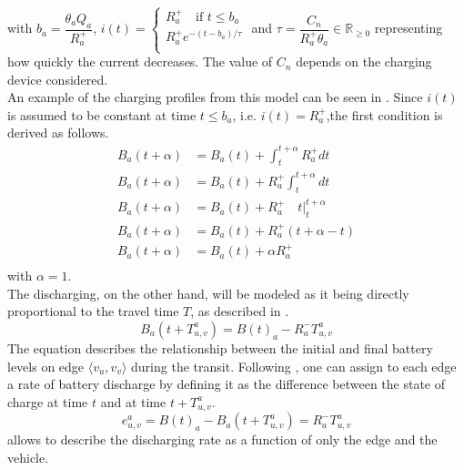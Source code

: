 with $b_a = \dfrac{\theta_a Q_a}{R^+_a}$,  $i(t)= \begin{cases} R^+_a \quad \text{if } t \leq  b_a\\
	R^+_a e^{-(t-b_a)/\tau}\\ \end{cases}$ and $\tau= \dfrac{C_n}{R^+_a\theta_a}\in \mathbb{R}_{\ge0}$  representing how quickly the current decreases. The value of $C_n$ depends on the charging device considered.   \\
	An example of the charging profiles from this model can be seen in . 
	 Since $i(t)$ is assumed to be constant at time $t\leq b_a$, i.e. $i(t) = R^+_a$,the first condition is derived as follows. 
\begin{align*}
	B_a(t+\alpha) &= B_a(t) + \int_{t}^{t+\alpha}R^+_adt\\
	B_a(t+\alpha) &= B_a(t) +R^+_a \int_{t}^{t+\alpha}dt\\
	B_a(t+\alpha) &= B_a(t) +R^+_a \quad t \bigg|_{t}^{t+\alpha}\\
	B_a(t+\alpha) &= B_a(t) +R^+_a (t+\alpha - t)\\
	B_a(t+\alpha) &= B_a(t) +\alpha R^+_a\\
\end{align*}
with $\alpha = 1$. \\
The discharging, on the other hand, will be modeled as it being directly proportional to the travel time $T$, as described in . 
\begin{equation}
	B_a(t+T_{u,v}^a) = B(t)_a - R^-_a T_{u,v}^a
	\label{eq:discharging}
\end{equation} 
The equation describes the relationship between the initial and final battery levels on edge $\langle v_u, v_v \rangle$ during the transit. Following , one can assign to each edge a rate of battery discharge by defining it as the difference between the state of charge at time $t$ and at time $t+T_{u,v}^a$. \\
\begin{equation}
	 e^a_{u,v} = B(t)_a - B_a(t+T_{u,v}^a) =  R^-_a T_{u,v}^a
	\label{eq:discharging_rate_per_edge}
\end{equation} 
 allows to describe the discharging rate as a function of only the edge and the vehicle. \\
